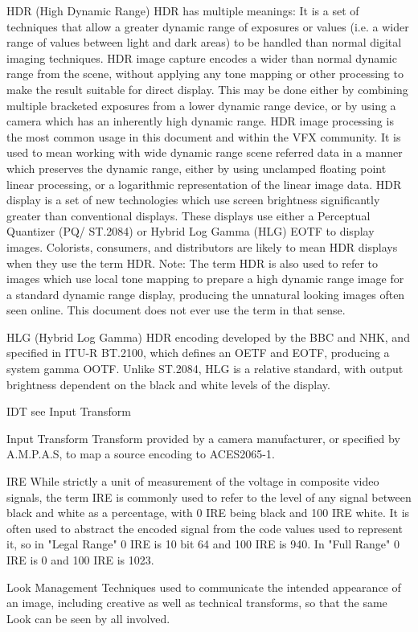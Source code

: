 HDR (High Dynamic Range) 
HDR has multiple meanings: It is a set of techniques that allow a greater dynamic range of exposures or values (i.e. a wider range of values between light and dark areas) to be handled than normal digital imaging techniques.
HDR image capture encodes a wider than normal dynamic range from the scene, without applying any tone mapping or other processing to make the result suitable for direct display. This may be done either by combining multiple bracketed exposures from a lower dynamic range device, or by using a camera which has an inherently high dynamic range.
HDR image processing is the most common usage in this document and within the VFX community. It is used to mean working with wide dynamic range scene referred data in a manner which preserves the dynamic range, either by using unclamped floating point linear processing, or a logarithmic representation of the linear image data.
HDR display is a set of new technologies which use screen brightness significantly greater than conventional displays. These displays use either a Perceptual Quantizer (PQ/ ST.2084) or Hybrid Log Gamma (HLG) EOTF to display images. Colorists, consumers, and distributors are likely to mean HDR displays when they use the term HDR. 
Note: The term HDR is also used to refer to images which use local tone mapping to prepare a high dynamic range image for a standard dynamic range display, producing the unnatural looking images often seen online. This document does not ever use the term in that sense.

HLG (Hybrid Log Gamma)
HDR encoding developed by the BBC and NHK, and specified in ITU-R BT.2100, which defines an OETF and EOTF, producing a system gamma OOTF. Unlike ST.2084, HLG is a relative standard, with output brightness dependent on the black and white levels of the display.

IDT see Input Transform

Input Transform
Transform provided by a camera manufacturer, or specified by A.M.P.A.S, to map a source encoding to ACES2065-1.

IRE
While strictly a unit of measurement of the voltage in composite video signals, the term IRE is commonly used to refer to the level of any signal between black and white as a percentage, with 0 IRE being black and 100 IRE white. It is often used to abstract the encoded signal from the code values used to represent it, so in "Legal Range" 0 IRE is 10 bit 64 and 100 IRE is 940. In "Full Range" 0 IRE is 0 and 100 IRE is 1023.

Look Management
Techniques used to communicate the intended appearance of an image, including creative as well as technical transforms, so that the same Look can be seen by all involved.

